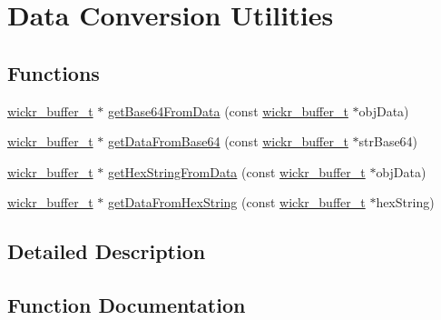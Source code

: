 \hypertarget{group__data__conversion__utilities}{}\section{Data Conversion Utilities}
\label{group__data__conversion__utilities}
\subsection*{Functions}
\begin{DoxyCompactItemize}
\item 
\hyperlink{structwickr__buffer}{wickr\+\_\+buffer\+\_\+t} $\ast$ \hyperlink{group__data__conversion__utilities_gae495c13035861b3410a4c19123e6cbde}{get\+Base64\+From\+Data} (const \hyperlink{structwickr__buffer}{wickr\+\_\+buffer\+\_\+t} $\ast$obj\+Data)
\item 
\hyperlink{structwickr__buffer}{wickr\+\_\+buffer\+\_\+t} $\ast$ \hyperlink{group__data__conversion__utilities_ga5441647c0e13fec49a4ef4b97513a515}{get\+Data\+From\+Base64} (const \hyperlink{structwickr__buffer}{wickr\+\_\+buffer\+\_\+t} $\ast$str\+Base64)
\item 
\hyperlink{structwickr__buffer}{wickr\+\_\+buffer\+\_\+t} $\ast$ \hyperlink{group__data__conversion__utilities_ga436efe786b59b2c46ad39a29255f2ecf}{get\+Hex\+String\+From\+Data} (const \hyperlink{structwickr__buffer}{wickr\+\_\+buffer\+\_\+t} $\ast$obj\+Data)
\item 
\hyperlink{structwickr__buffer}{wickr\+\_\+buffer\+\_\+t} $\ast$ \hyperlink{group__data__conversion__utilities_ga1ca57ec73a4daf858c3721569ab7feeb}{get\+Data\+From\+Hex\+String} (const \hyperlink{structwickr__buffer}{wickr\+\_\+buffer\+\_\+t} $\ast$hex\+String)
\end{DoxyCompactItemize}


\subsection{Detailed Description}


\subsection{Function Documentation}
\mbox{\label{group__data__conversion__utilities_gae495c13035861b3410a4c19123e6cbde}} 
